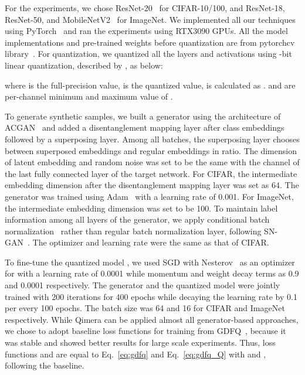 \documentclass{article}
\newcommand{\aname}{Qimera\xspace}
\newcommand{\JL}[1]{{\color{magenta}[\textbf{\sc JLee}: \textit{#1}]}}
\newcommand{\KH}[1]{{\color{purple}[\textbf{\sc KH}: \textit{#1}]}}
\renewcommand{\JL}[1]{}
\renewcommand{\KH}[1]{}
\begin{document}
For the experiments, we chose ResNet-20~\cite{resnet} for CIFAR-10/100, and ResNet-18, ResNet-50, and MobileNetV2~\cite{mobilenetv2} for ImageNet. 
We implemented all our techniques using PyTorch~\cite{pytorch} and ran the experiments using RTX3090 GPUs.
All the model implementations and pre-trained weights before quantization are from pytorchcv library~\cite{pytorchcv}. 
For quantization, we quantized all the layers and activations using -bit linear quantization, described by \cite{jacob2018quantization}, as below:

\KH{Change notation to functional form}
where  is the full-precision value,  is the quantized value,  is calculated as . 
 and  are per-channel minimum and maximum value of . \KH{function notation}
 

To generate synthetic samples, we built a generator using the architecture of ACGAN~\cite{acgan} and added a disentanglement mapping layer after class embeddings followed by a superposing layer. 
Among all batches, the superposing layer chooses between superposed embeddings and regular embeddings in  ratio. 
The dimension of latent embedding and random noise was set to be the same with the channel of the last fully connected layer of the target network. 
For CIFAR, the intermediate embedding dimension after the disentanglement mapping layer was set as 64. 
The generator was trained using Adam~\cite{adam} with a learning rate of 0.001. 
For ImageNet, the intermediate embedding dimension was set to be 100. 
To maintain label information among all layers of the generator, we apply conditional batch normalization~\cite{CBN} rather than regular batch normalization layer, following SN-GAN~\cite{sngan}. 
The optimizer and learning rate were the same as that of CIFAR. 


\JL{need a space before citation brackets! usually a unbreakable space (\textasciitilde) is preferred.}
To fine-tune the quantized model , we used SGD with Nesterov~\cite{nesterov} as an optimizer for  with a learning rate of 0.0001 while momentum and weight decay terms as 0.9 and 0.0001 respectively. 
The generator  and the quantized model  were jointly trained with 200 iterations for 400 epochs while decaying the learning rate by 0.1 per every 100 epochs. The batch size was 64 and 16 for CIFAR and ImageNet respectively. 
While \aname can be applied almost all generator-based approaches, we chose to adopt baseline loss functions for training from GDFQ~\cite{gdfq}, because it was stable and showed better results for large scale experiments.
Thus, loss functions  and  are equal to Eq.~\ref{eq:gdfq} and Eq.~\ref{eq:gdfq_Q} with  and , following the baseline.
\KH{Isn't it too similar with GDFQ?}\JL{I added `following the baseline'}
\JL{hyparm p and K?}
\end{document}
